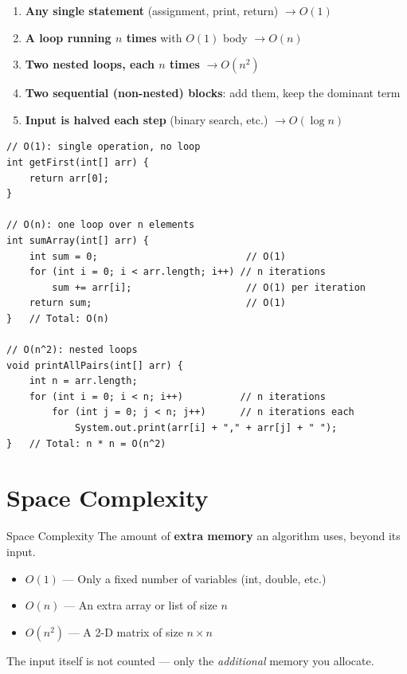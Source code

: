 \documentclass[12pt,a4paper,oneside]{book}
\begin{document}
\begin{enumerate}
  \item \textbf{Any single statement} (assignment, print, return) $\to O(1)$
  \item \textbf{A loop running $n$ times} with $O(1)$ body $\to O(n)$
  \item \textbf{Two nested loops, each $n$ times} $\to O(n^2)$
  \item \textbf{Two sequential (non-nested) blocks}: add them, keep the dominant term
  \item \textbf{Input is halved each step} (binary search, etc.) $\to O(\log n)$
\end{enumerate}

\begin{lstlisting}[caption={Identifying complexity from code structure}]
// O(1): single operation, no loop
int getFirst(int[] arr) {
    return arr[0];
}

// O(n): one loop over n elements
int sumArray(int[] arr) {
    int sum = 0;                          // O(1)
    for (int i = 0; i < arr.length; i++) // n iterations
        sum += arr[i];                    // O(1) per iteration
    return sum;                           // O(1)
}   // Total: O(n)

// O(n^2): nested loops
void printAllPairs(int[] arr) {
    int n = arr.length;
    for (int i = 0; i < n; i++)          // n iterations
        for (int j = 0; j < n; j++)      // n iterations each
            System.out.print(arr[i] + "," + arr[j] + " ");
}   // Total: n * n = O(n^2)
\end{lstlisting}

\section{Space Complexity}

\begin{definitionbox}{Space Complexity}
The amount of \textbf{extra memory} an algorithm uses, beyond its input.
\begin{itemize}
  \item $O(1)$ --- Only a fixed number of variables (int, double, etc.)
  \item $O(n)$ --- An extra array or list of size $n$
  \item $O(n^2)$ --- A 2-D matrix of size $n \times n$
\end{itemize}
The input itself is not counted --- only the \textit{additional} memory you allocate.
\end{definitionbox}
\end{document}
